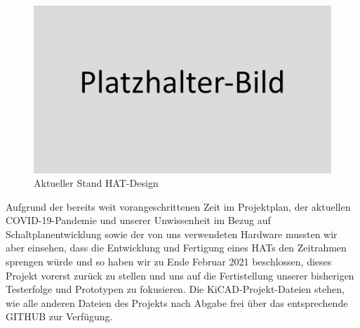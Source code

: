 \begin{figure}[h!tb]
	\includegraphics[width=1\textwidth]{img/placeholder.png}
	\caption[Aktueller Stand HAT-Design]{Aktueller Stand HAT-Design}
	\label{hat-design}
\end{figure}
Aufgrund der bereits weit vorangeschrittenen Zeit im Projektplan, der aktuellen COVID-19-Pandemie und unserer Unwissenheit im Bezug auf Schaltplanentwicklung sowie der von uns verwendeten Hardware mussten wir aber einsehen, dass die Entwicklung und Fertigung eines HATs den Zeitrahmen sprengen würde und so haben wir zu Ende Februar 2021 beschlossen, dieses Projekt vorerst zurück zu stellen und uns auf die Fertistellung unserer bisherigen Testerfolge und Prototypen zu fokusieren. Die KiCAD-Projekt-Dateien stehen, wie alle anderen Dateien des Projekts nach Abgabe frei über das entsprechende GITHUB zur Verfügung.\par